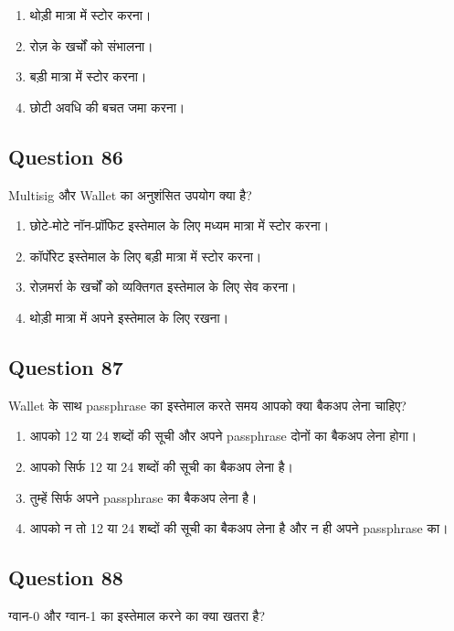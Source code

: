 \documentclass[12pt,a4paper]{article}
\begin{document}
\begin{enumerate}[label=\Alph*., leftmargin=*]
\item थोड़ी मात्रा में स्टोर करना।
\item रोज़ के खर्चों को संभालना।
\item बड़ी मात्रा में स्टोर करना।
\item छोटी अवधि की बचत जमा करना।
\end{enumerate}

\bigskip


\subsection*{Question 86}
Multisig और Wallet का अनुशंसित उपयोग क्या है?

\begin{enumerate}[label=\Alph*., leftmargin=*]
\item छोटे-मोटे नॉन-प्रॉफिट इस्तेमाल के लिए मध्यम मात्रा में स्टोर करना।
\item कॉर्पोरेट इस्तेमाल के लिए बड़ी मात्रा में स्टोर करना।
\item रोज़मर्रा के खर्चों को व्यक्तिगत इस्तेमाल के लिए सेव करना।
\item थोड़ी मात्रा में अपने इस्तेमाल के लिए रखना।
\end{enumerate}

\bigskip


\subsection*{Question 87}
Wallet के साथ passphrase का इस्तेमाल करते समय आपको क्या बैकअप लेना चाहिए?

\begin{enumerate}[label=\Alph*., leftmargin=*]
\item आपको 12 या 24 शब्दों की सूची और अपने passphrase दोनों का बैकअप लेना होगा।
\item आपको सिर्फ 12 या 24 शब्दों की सूची का बैकअप लेना है।
\item तुम्हें सिर्फ अपने passphrase का बैकअप लेना है।
\item आपको न तो 12 या 24 शब्दों की सूची का बैकअप लेना है और न ही अपने passphrase का।
\end{enumerate}

\bigskip


\subsection*{Question 88}
ग्वान-0 और ग्वान-1 का इस्तेमाल करने का क्या खतरा है?
\end{document}
